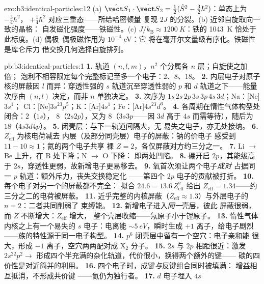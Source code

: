 \begin{solution}{exo:b3:identical-particles:12}
(a) $\hat{\vect S}_1\cdot\hat{\vect S}_2 = \tfrac12(\hat S^2 -
\tfrac32\hbar^2)$：单态上为 $-\tfrac34\hbar^2$，
$+\tfrac14\hbar^2$ 对应三重态——所给哈密顿量
复现 $2J$ 的分裂。(b) 近邻自旋取向一致的晶格：
自发磁化强度——铁磁性。(c) $J/k_{\text{B}}
\approx \qty{1200}{K}$：铁的 \qty{1043}{K} 恰处于
此标度。(d) 偶极–偶极磁作用为 $10^{-4}$ eV：它
将在毫开尔文量级有序化。铁磁性是库仑斥力
借交换几何选择自旋排列。
\end{solution}

\begin{solution}{pb:b3:identical-particles:1}
\textbf{1.} 轨道 $(n, l, m)$，$n^2$ 个分属各 $n$ 层；自旋使之加倍；
泡利不相容限定每个完整标记至多一个电子：$2$、$8$、$18$。
\textbf{2.} 内层电子对原子核的屏蔽因
$l$ 而异：穿透性强的 $s$ 轨道沉至穿透性弱的
$p$ 和 $d$ 轨道之下——能量次序由 $(n, l)$ 决定，而非 $n$
单独决定。
\textbf{3.} 次序为 $1s\,2s\,2p\,3s\,3p\,4s\,3d$；Na：[Ne]$3s^1$；
Cl：[Ne]$3s^23p^5$；K：[Ar]$4s^1$；Fe：[Ar]$4s^23d^6$。
\textbf{4.} 各周期在惰性气体构型处闭合：$2$（$1s$），
$8$（$2s2p$），又为 $8$（$3s3p$——因 $3d$ 高于 $4s$
而需等待），随后为 $18$（$4s3d4p$）。
\textbf{5.} 闭壳层：与下一轨道间隔大，无
易失之电子，亦无处接纳。
\textbf{6.} $Z_{\text{eff}}$ 为核电荷减去
内层（及部分同壳层）电子的屏蔽：钠的价电子
感受到 $11 - 10 \approx 1$；氦的两个电子共享
裸 $Z = 2$，各仅屏蔽对方约三分之一。
\textbf{7.} Li $\to$ Be 上升，在 B 处下降；N $\to$ O 下降：
即两处凹陷。
\textbf{8.} 硼开启 $2p$，其能级高于
$2s$，穿透性更弱，故新增电子更易移去。
\textbf{9.} 氧首次须让两个电子\emph{成对}
占据同一 $p$ 轨道：额外斥力，丧失交换稳定化
——第四个 $2p$ 电子的贡献被打折。
\textbf{10.} 每个电子对另一个的屏蔽都不完全：
拟合 $24.6 = 13.6\,Z_{\text{eff}}^2$ 给出 $Z_{\text{eff}} =
1.34$——约三分之二的电荷被屏蔽。
\textbf{11.} 近乎完整的内核屏蔽（$Z_{\text{eff}}
\approx 1.3$）与外层电子的 $n = 2$：二者共同削弱了
束缚能。
\textbf{12.} 新增电子进入\emph{同一}壳层，彼此
屏蔽很弱，而 $Z$ 不断增大：$Z_{\text{eff}}$ 增大，
整个壳层收缩——氖原子小于锂原子。
\textbf{13.} 惰性气体内核之上有一个易失的 $s$ 电子：电离能
$\sim\qty{5}{eV}$，瞬时生成 $+1$ 离子，给电子剧烈
——族的特性源于同一电子构型。
\textbf{14.} $p^6$ 闭壳层中留有一个空穴：电子亲和能
很大，形成 $-1$ 离子，空穴两两配对成 X$_2$ 分子。
\textbf{15.} $2s$ 与 $2p$ 相距很近：激发 $2s^22p^2 \to$
形成四个半充满的杂化轨道，代价很小，换得两个额外的键——
碳的四价性是对近简并的利用。
\textbf{16.} 四个电子时，成键\emph{与}反键组合同时被填满：
增益相互抵消，不形成共价键
——氦仍为独行者。
\textbf{17.} $d$ 电子埋入 $4s$

\end{solution}
